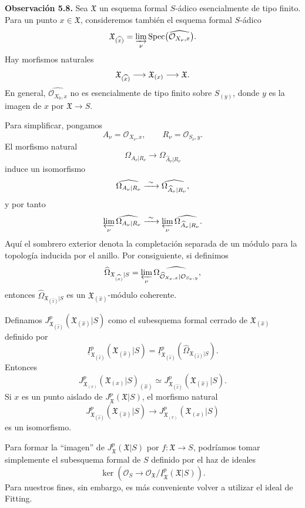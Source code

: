 \par\medskip
\noindent\textbf{Observación 5.8.}
Sea $\mathfrak X$ un esquema formal $S$-ádico esencialmente de tipo
finito. Para un punto $x\in\mathfrak X$, consideremos también el
esquema formal $S$-ádico
\[
\mathfrak X_{(\widehat{\sisi{X}{x}})}
=\varinjlim_\nu
 \operatorname{Spec}\bigl(\widehat{\mathcal O_{X_\nu,x}}\bigr).
\]
Hay morfismos naturales
\[
\mathfrak X_{(\widehat{\sisi{X}{x}})}
\longrightarrow\mathfrak X_{(x)}
\longrightarrow\mathfrak X.
\]
En general, $\widehat{\mathcal O_{X_0,x}}$ no es esencialmente de
tipo finito sobre $S_{(y)}$, donde $y$ es la imagen de $x$ por
$\mathfrak X\longrightarrow S$.

Para simplificar, pongamos
\[
A_\nu=\mathcal O_{X_\nu,x},
\qquad R_\nu=\mathcal O_{S_\nu,y}.
\]
El morfismo natural
\[
\Omega_{A_\nu|R_\nu}
\longrightarrow\Omega_{\widehat A_\nu|R_\nu}
\]
induce un isomorfismo
\[
\widehat{\Omega_{A_\nu|R_\nu}}
\xrightarrow{\ \sim\ }
\sisi{\widehat{\widehat\Omega_{A_\nu|R_\nu}}}{\widehat{\Omega_{\widehat A_\nu|R_\nu}}},
\]
y por tanto
\[
\varprojlim_\nu\widehat{\Omega_{A_\nu|R_\nu}}
\xrightarrow{\ \sim\ }
\varprojlim_\nu
 \sisi{\widehat{\Omega_{\widehat A_\nu|R_\nu}}}{\widehat{\Omega_{\widehat A_\nu|R_\nu}}}.
\]
Aquí el sombrero exterior denota la completación separada de un
módulo para la topología inducida por el anillo. Por consiguiente, si
definimos
\[
\widehat\Omega_{\mathfrak X_{(\widehat{x})}|S}
=\varprojlim_\nu
 \sisi{\widehat{\Omega_{
   \widehat{\mathcal O}_{X_\nu,x}|\mathcal O_{S_\nu,y}}}}{\widehat{\Omega_{
   \widehat{\mathcal O}_{X_\nu,x}|\mathcal O_{S_\nu,y}}}},
\]
entonces $\widehat\Omega_{\mathfrak X_{(\widehat{x})}|S}$ es un
$\mathfrak X_{(\widehat{x})}$-módulo coherente.


Definamos
$J_{\mathfrak X_{(\widehat{x})}}^p
 (\mathfrak X_{(\widehat{x})}|S)$
como el subesquema formal cerrado de
$\mathfrak X_{(\widehat{x})}$ definido por
\[
\underline I_{\mathfrak X_{(\widehat{x})}}^p
 (\mathfrak X_{(\widehat{x})}|S)
=\underline I_{\mathfrak X_{(\widehat{x})}}^p
 (\widehat\Omega_{\mathfrak X_{(\widehat{x})}|S}).
\]
Entonces
\[
J_{\mathfrak X_{(x)}}^p(\mathfrak X_{(x)}|S)_{(\widehat{x})}
\simeq
J_{\mathfrak X_{(\widehat{x})}}^p
 (\mathfrak X_{(\widehat{x})}|S).
\]
Si $x$ es un punto aislado de
$J_{\mathfrak X}^p(\mathfrak X|S)$, el morfismo natural
\[
J_{\mathfrak X_{(\widehat{x})}}^p
 (\mathfrak X_{(\widehat{x})}|S)
\longrightarrow
J_{\mathfrak X_{(x)}}^p(\mathfrak X_{(x)}|S)
\]
es un isomorfismo.

Para formar la ``imagen'' de $J_{\mathfrak X}^p(\mathfrak X|S)$ por
$f:\mathfrak X\longrightarrow S$, podríamos tomar simplemente el
subesquema formal de $S$ definido por el haz de ideales
\[
\ker\left(
 \mathcal O_S\longrightarrow
 \mathcal O_{\mathfrak X}/
 \underline I_{\mathfrak X}^p(\mathfrak X|S)
\right).
\]
Para nuestros fines, sin embargo, es más conveniente volver a utilizar
el ideal de Fitting.
